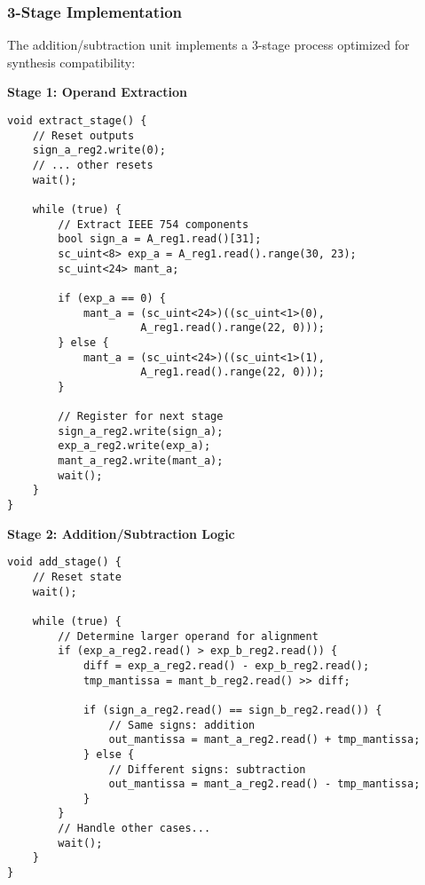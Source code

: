 \subsubsection{3-Stage Implementation}

The addition/subtraction unit implements a 3-stage process optimized for synthesis compatibility:

\textbf{Stage 1: Operand Extraction}
\begin{lstlisting}[caption=Extraction Stage Implementation]
void extract_stage() {
    // Reset outputs
    sign_a_reg2.write(0);
    // ... other resets
    wait();
    
    while (true) {
        // Extract IEEE 754 components
        bool sign_a = A_reg1.read()[31];
        sc_uint<8> exp_a = A_reg1.read().range(30, 23);
        sc_uint<24> mant_a;
        
        if (exp_a == 0) {
            mant_a = (sc_uint<24>)((sc_uint<1>(0), 
                     A_reg1.read().range(22, 0)));
        } else {
            mant_a = (sc_uint<24>)((sc_uint<1>(1), 
                     A_reg1.read().range(22, 0)));
        }
        
        // Register for next stage
        sign_a_reg2.write(sign_a);
        exp_a_reg2.write(exp_a);
        mant_a_reg2.write(mant_a);
        wait();
    }
}
\end{lstlisting}

\textbf{Stage 2: Addition/Subtraction Logic}
\begin{lstlisting}[caption=Addition Core Logic]
void add_stage() {
    // Reset state
    wait();
    
    while (true) {
        // Determine larger operand for alignment
        if (exp_a_reg2.read() > exp_b_reg2.read()) {
            diff = exp_a_reg2.read() - exp_b_reg2.read();
            tmp_mantissa = mant_b_reg2.read() >> diff;
            
            if (sign_a_reg2.read() == sign_b_reg2.read()) {
                // Same signs: addition
                out_mantissa = mant_a_reg2.read() + tmp_mantissa;
            } else {
                // Different signs: subtraction
                out_mantissa = mant_a_reg2.read() - tmp_mantissa;
            }
        }
        // Handle other cases...
        wait();
    }
}
\end{lstlisting}

